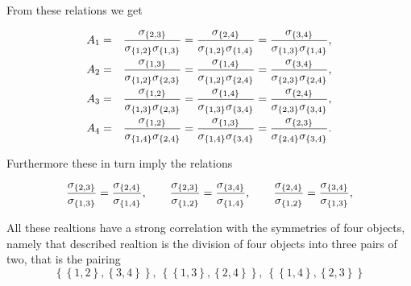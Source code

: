 \documentclass[11pt]{article}
\begin{document}
From these relations we get

\begin{eqnarray*}
A_{1} &=&\frac{\sigma _{\left\{ 2,3\right\} }}{\sigma _{\left\{ 1,2\right\}
}\sigma _{\left\{ 1,3\right\} }}=\frac{\sigma _{\left\{ 2,4\right\} }}{%
\sigma _{\left\{ 1,2\right\} }\sigma _{\left\{ 1,4\right\} }}=\frac{\sigma
_{\left\{ 3,4\right\} }}{\sigma _{\left\{ 1,3\right\} }\sigma _{\left\{
1,4\right\} }}, \\
A_{2} &=&\frac{\sigma _{\left\{ 1,3\right\} }}{\sigma _{\left\{ 1,2\right\}
}\sigma _{\left\{ 2,3\right\} }}=\frac{\sigma _{\left\{ 1,4\right\} }}{%
\sigma _{\left\{ 1,2\right\} }\sigma _{\left\{ 2,4\right\} }}=\frac{\sigma
_{\left\{ 3,4\right\} }}{\sigma _{\left\{ 2,3\right\} }\sigma _{\left\{
2,4\right\} }}, \\
A_{3} &=&\frac{\sigma _{\left\{ 1,2\right\} }}{\sigma _{\left\{ 1,3\right\}
}\sigma _{\left\{ 2,3\right\} }}=\frac{\sigma _{\left\{ 1,4\right\} }}{%
\sigma _{\left\{ 1,3\right\} }\sigma _{\left\{ 3,4\right\} }}=\frac{\sigma
_{\left\{ 2,4\right\} }}{\sigma _{\left\{ 2,3\right\} }\sigma _{\left\{
3,4\right\} }}, \\
A_{4} &=&\frac{\sigma _{\left\{ 1,2\right\} }}{\sigma _{\left\{ 1,4\right\}
}\sigma _{\left\{ 2,4\right\} }}=\frac{\sigma _{\left\{ 1,3\right\} }}{%
\sigma _{\left\{ 1,4\right\} }\sigma _{\left\{ 3,4\right\} }}=\frac{\sigma
_{\left\{ 2,3\right\} }}{\sigma _{\left\{ 2,4\right\} }\sigma _{\left\{
3,4\right\} }}.
\end{eqnarray*}

Furthermore these in turn imply the relations

\begin{equation}
\frac{\sigma _{\left\{ 2,3\right\} }}{\sigma _{\left\{ 1,3\right\} }}=\frac{%
\sigma _{\left\{ 2,4\right\} }}{\sigma _{\left\{ 1,4\right\} }},\qquad \frac{%
\sigma _{\left\{ 2,3\right\} }}{\sigma _{\left\{ 1,2\right\} }}=\frac{\sigma
_{\left\{ 3,4\right\} }}{\sigma _{\left\{ 1,4\right\} }},\qquad \frac{\sigma
_{\left\{ 2,4\right\} }}{\sigma _{\left\{ 1,2\right\} }}=\frac{\sigma
_{\left\{ 3,4\right\} }}{\sigma _{\left\{ 1,3\right\} }},
\label{Sigma Relations}
\end{equation}

All these realtions have a strong correlation with the symmetries of four
objects, namely that described realtion is the division of four objects into
three pairs of two, that is the pairing%
\begin{equation*}
\left\{ \left\{ 1,2\right\} ,\left\{ 3,4\right\} \right\} ,~\left\{ \left\{
1,3\right\} ,\left\{ 2,4\right\} \right\} ,~\left\{ \left\{ 1,4\right\}
,\left\{ 2,3\right\} \right\}
\end{equation*}
\end{document}

